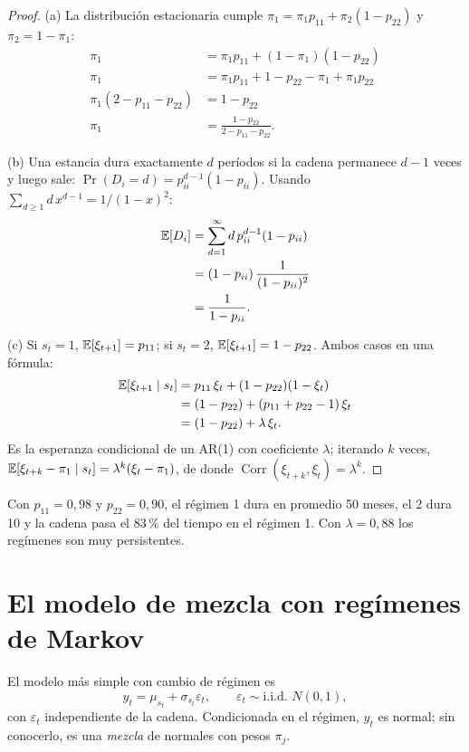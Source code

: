 \begin{proof}
(a) La distribución estacionaria cumple $\pi_1=\pi_1p_{11}+\pi_2(1-p_{22})$ y $\pi_2=1-\pi_1$:
\begin{align*}
  \pi_1 &= \pi_1p_{11}+(1-\pi_1)(1-p_{22})\\
  \pi_1 &= \pi_1p_{11}+1-p_{22}-\pi_1+\pi_1p_{22}\\
  \pi_1(2-p_{11}-p_{22}) &= 1-p_{22}\\
  \pi_1 &= \frac{1-p_{22}}{2-p_{11}-p_{22}}.
\end{align*}

(b) Una estancia dura exactamente $d$ períodos si la cadena permanece $d-1$ veces y luego sale:
$\Pr(D_i=d)=p_{ii}^{d-1}(1-p_{ii})$. Usando $\sum_{d\ge1}d\,x^{d-1}=1/(1-x)^2$:
\begin{align*}
  \mathbb{E}[D_i] &= \sum_{d=1}^{\infty}d\,p_{ii}^{d-1}(1-p_{ii})\\
          &= (1-p_{ii})\,\frac{1}{(1-p_{ii})^2}\\
          &= \frac{1}{1-p_{ii}}.
\end{align*}

(c) Si $s_t=1$, $\mathbb{E}[\xi_{t+1}]=p_{11}$; si $s_t=2$, $\mathbb{E}[\xi_{t+1}]=1-p_{22}$. Ambos casos en una fórmula:
\begin{align*}
  \mathbb{E}[\xi_{t+1}\mid s_t] &= p_{11}\,\xi_t+(1-p_{22})(1-\xi_t)\\
                        &= (1-p_{22})+(p_{11}+p_{22}-1)\,\xi_t\\
                        &= (1-p_{22})+\lambda\,\xi_t .
\end{align*}
Es la esperanza condicional de un AR(1) con coeficiente $\lambda$; iterando $k$ veces,
$\mathbb{E}[\xi_{t+k}-\pi_1\mid s_t]=\lambda^k(\xi_t-\pi_1)$, de donde $\operatorname{Corr}(\xi_{t+k},\xi_t)=\lambda^k$.
\end{proof}

Con $p_{11}=0{,}98$ y $p_{22}=0{,}90$, el régimen 1 dura en promedio 50 meses, el 2 dura 10 y la cadena pasa el 83\,\%
del tiempo en el régimen 1. Con $\lambda=0{,}88$ los regímenes son muy persistentes.

\section{El modelo de mezcla con regímenes de Markov}

El modelo más simple con cambio de régimen es
\[
  y_t=\mu_{s_t}+\sigma_{s_t}\varepsilon_t,\qquad \varepsilon_t\sim\text{i.i.d. }N(0,1),
\]
con $\varepsilon_t$ independiente de la cadena. Condicionada en el régimen, $y_t$ es normal; sin conocerlo, es una
\emph{mezcla} de normales con pesos $\pi_j$.

